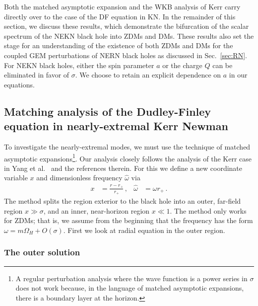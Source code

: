 \begin{refsection}
Both the matched asymptotic expansion and the WKB analysis of Kerr carry directly over to the case of the DF equation in KN. 
In the remainder of this section, we discuss these results, which demonstrate the bifurcation of the scalar spectrum of the NEKN black hole into ZDMs and DMs.
These results also set the stage for an understanding of the existence of both ZDMs and DMs for the coupled GEM perturbations of NERN black holes as discussed in Sec.~\ref{sec:RN}. 
For NEKN black holes, either the spin parameter $a$ or the charge $Q$ can be eliminated in favor of $\sigma$. 
We choose to retain an explicit dependence on $a$ in our equations.

\subsection{Matching analysis of the Dudley-Finley equation in nearly-extremal Kerr Newman}
\label{sec:Matching}

To investigate the nearly-extremal modes, we must use the technique of matched asymptotic expansions\footnote{A regular perturbation analysis where the wave function is a power series in $\sigma$ does not work because, in the language of matched asymptotic expansions, there is a boundary layer at the horizon.}.
Our analysis closely follows the analysis of the Kerr case in Yang et al.~\cite{Yang:2013uba} and the references therein. 
For this we define a new coordinate variable $x$ and dimensionless frequency $\hat \omega$ via
\begin{align}
x & = \frac{r - r_+}{r_+} \,,  & \hat \omega &= \omega r_+ \,.
\end{align}
The method splits the region exterior to the black hole into an outer, far-field region $x \gg \sigma$, and an inner, near-horizon region $x \ll 1$. 
The method only works for ZDMs; that is, we assume from the beginning that the frequency has the form $\omega = m \Omega_H + O(\sigma)$. 
First we look at radial equation in the outer region.

\subsubsection{The outer solution}


\end{refsection}
